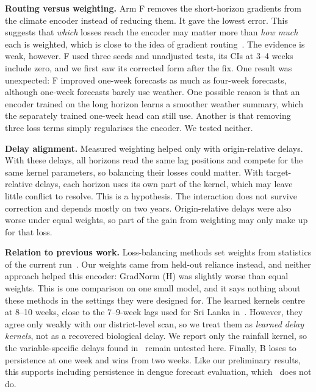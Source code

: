 \documentclass[conference]{IEEEtran}
\begin{document}
\textbf{Routing versus weighting.} Arm F removes the short-horizon gradients from the climate encoder instead of reducing them. It gave the lowest error. This suggests that \emph{which} losses reach the encoder may matter more than \emph{how much} each is weighted, which is close to the idea of gradient routing~\cite{cloud2024gradient}. The evidence is weak, however. F used three seeds and unadjusted tests, its CIs at 3--4 weeks include zero, and we first saw its corrected form after the fix. One result was unexpected: F improved one-week forecasts as much as four-week forecasts, although one-week forecasts barely use weather. One possible reason is that an encoder trained on the long horizon learns a smoother weather summary, which the separately trained one-week head can still use. Another is that removing three loss terms simply regularises the encoder. We tested neither.

\textbf{Delay alignment.} Measured weighting helped only with origin-relative delays. With these delays, all horizons read the same lag positions and compete for the same kernel parameters, so balancing their losses could matter. With target-relative delays, each horizon uses its own part of the kernel, which may leave little conflict to resolve. This is a hypothesis. The interaction does not survive correction and depends mostly on two years. Origin-relative delays were also worse under equal weights, so part of the gain from weighting may only make up for that loss.

\textbf{Relation to previous work.} Loss-balancing methods set weights from statistics of the current run~\cite{chen2018gradnorm,kendall2018multi}. Our weights came from held-out reliance instead, and neither approach helped this encoder: GradNorm (H) was slightly worse than equal weights. This is one comparison on one small model, and it says nothing about these methods in the settings they were designed for. The learned kernels centre at 8--10 weeks, close to the 7--9-week lags used for Sri Lanka in~\cite{liu2025explainable}. However, they agree only weakly with our district-level scan, so we treat them as \emph{learned delay kernels}, not as a recovered biological delay. We report only the rainfall kernel, so the variable-specific delays found in~\cite{lowe2018barbados} remain untested here. Finally, B loses to persistence at one week and wins from two weeks. Like our preliminary results, this supports including persistence in dengue forecast evaluation, which~\cite{gulmohamed2026denguegnn} does not do.
\end{document}
